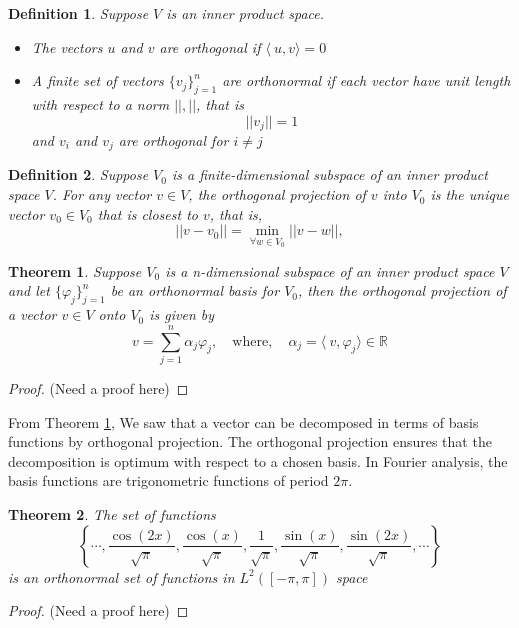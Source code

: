 \documentclass[11pt, oneside]{article}   	%
\newtheorem{theorem}{Theorem}
\newtheorem{definition}{Definition}
\newtheorem{proof}{Proof}
\begin{document}
\begin{definition}
Suppose $V$ is an inner product space.
\begin{itemize}
\item The vectors $u$ and $v$ are orthogonal if $\langle\ u,v \rangle = 0$
\item A finite set of vectors $\{ v_{j} \}_{j=1}^{n}$ are orthonormal if each vector have unit length with respect to a norm $||, ||$, that is 
\begin{equation}
||v_{j}|| = 1 \nonumber
\end{equation}
and $v_{i}$ and $v_{j}$ are orthogonal for $i\neq j$ 
\end{itemize}
\end{definition}


\begin{definition}
Suppose $V_{0}$ is a finite-dimensional subspace of an inner product space $V$. For any vector $v \in V$, the orthogonal projection of $v$
into $V_{0}$ is the unique vector $v_{0} \in V_{0}$ that is closest to $v$, that is,
\begin{equation}
 ||v-v_{0}|| =  \min_{\forall w \in V_{0}} || v-w ||,
\end{equation}
\end{definition}

\begin{theorem}\label{orthogonalityTheorem}
Suppose $V_{0}$ is a  n-dimensional subspace of an inner product space $V$ and let $\{  \varphi_{j} \}_{j=1}^{n}$ be an orthonormal basis for $V_{0}$, then the orthogonal projection
of a vector $v\in V$ onto $V_{0}$ is given by 
\begin{equation}
v = \sum_{j=1}^{n}\alpha_{j}\varphi_{j}, \quad \text{where}, \quad \alpha_{j} = \langle\ v,\varphi_{j} \rangle \in \mathbb{R}
\end{equation}
\end{theorem}

\begin{proof}
(Need a proof here) 
\end{proof}

\justify
From Theorem \ref{orthogonalityTheorem}, We saw that a vector can be decomposed in terms of basis functions by orthogonal projection. The orthogonal projection ensures that the decomposition is optimum with respect to a chosen basis. In Fourier analysis, the basis functions are trigonometric functions of period $2\pi$.
\begin{theorem}
The set of functions 
\begin{equation}
\left \{ \cdots, \frac{\cos(2x)}{\sqrt{\pi}},\frac{\cos(x)}{\sqrt{\pi}},\frac{1}{\sqrt{\pi}}, \frac{\sin(x)}{\sqrt{\pi}},\frac{\sin(2x)}{\sqrt{\pi}},\cdots  \right \}
\end{equation}
is an orthonormal set of functions in $L^{2}([-\pi,\pi])$ space
\end{theorem}
\begin{proof}
(Need a proof here) 
\end{proof}
\end{document}
